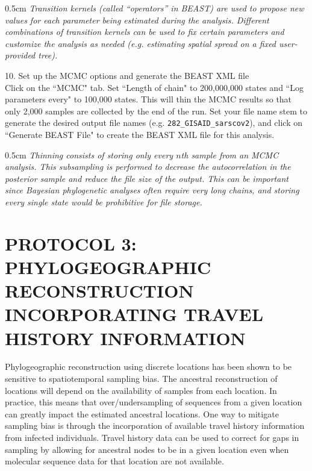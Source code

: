 \documentclass{article}
\newcommand{\ann}[1]{
\begin{adjustwidth}{0.5cm}{}
\it{#1}\\
\end{adjustwidth}}
\begin{document}
\ann{Transition kernels (called ``operators'' in BEAST) are used to propose new values for each parameter being estimated during the analysis.
Different combinations of transition kernels can be used to fix certain parameters %
and customize the analysis as needed (e.g. estimating spatial spread on a fixed user-provided tree).}

10. Set up the MCMC options and generate the BEAST XML file\\

Click on the ``MCMC" tab. Set ``Length of chain" to 200,000,000 states and ``Log parameters every" to 100,000 states.
This will thin the MCMC results so that only 2,000 samples are collected by the end of the run.
Set your file name stem to generate the desired output file names (e.g. \texttt{282\_GISAID\_sarscov2}), and click on ``Generate BEAST File" to create the BEAST XML file for this analysis.\\

\ann{Thinning consists of storing only every $n$th sample from an MCMC analysis. This subsampling is performed to decrease the autocorrelation in the posterior sample and reduce the file size of the output. This can be important since Bayesian phylogenetic analyses often require very long chains, and storing every single state would be prohibitive for file storage.}


\section*{PROTOCOL 3: PHYLOGEOGRAPHIC RECONSTRUCTION INCORPORATING TRAVEL HISTORY INFORMATION}

Phylogeographic reconstruction using discrete locations has been shown to be sensitive to spatiotemporal sampling bias. The ancestral reconstruction of locations will depend on the availability of samples from each location. In practice, this means that over/undersampling of sequences from a given location can greatly impact the estimated ancestral locations. One way to mitigate sampling bias is through the incorporation of available travel history information from infected individuals. Travel history data can be used to correct for gaps in sampling by allowing for ancestral nodes to be in a given location even when molecular sequence data for that location are not available.\\
\end{document}
